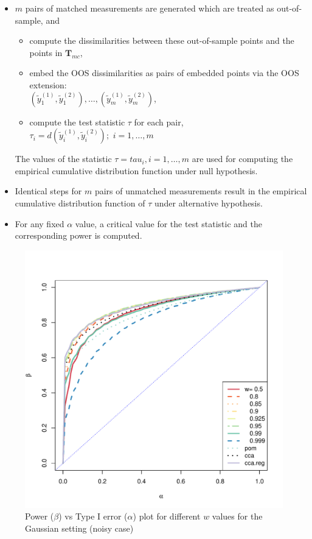 \documentclass[12pt,oneside,final]{thesis}\usepackage[]{graphicx}\usepackage[]{color}
\begin{document}
\begin{itemize}
\item  $m$ pairs of matched   measurements are generated which are treated as out-of-sample, and 
\begin{itemize}
\item compute the dissimilarities  %
 between these out-of-sample  points and the points in ${\mathbf{T}_{mc}}$,  
\item  embed the OOS dissimilarities as pairs of embedded points via the OOS extension:\\
 $(\tilde{y}_1^{(1)},\tilde{y}_1^{(2)}),\ldots, (\tilde{y}_m^{(1)},\tilde{y}_m^{(2)})$, 
\item compute the test statistic $\tau$ for each pair, $\tau_i=d(\tilde{y}_i^{(1)},\tilde{y}_i^{(2)});\hspace{4pt}
i=1,\ldots,m$
\end{itemize}
 The values of the statistic $\tau={tau_i,i=1,\ldots,m}$ are used for computing  the empirical cumulative distribution function under null hypothesis. 

\item Identical steps for $m$ pairs of unmatched measurements result in the empirical cumulative distribution  function of $\tau$ under alternative hypothesis.
\item For any fixed $\alpha$ value, a critical value for the test statistic and the corresponding power is computed.
\end{itemize}



\begin{figure}
\includegraphics[scale=0.75]{MVN-FC-Tradeoff-OOS-c0_01.pdf}
\caption{Power ($\beta$) vs Type I error ($\alpha$) plot for different $w$ values for the Gaussian setting (noisy case)}
\label{fig:MVN-c001-power-alpha}
\end{figure}
\end{document}
